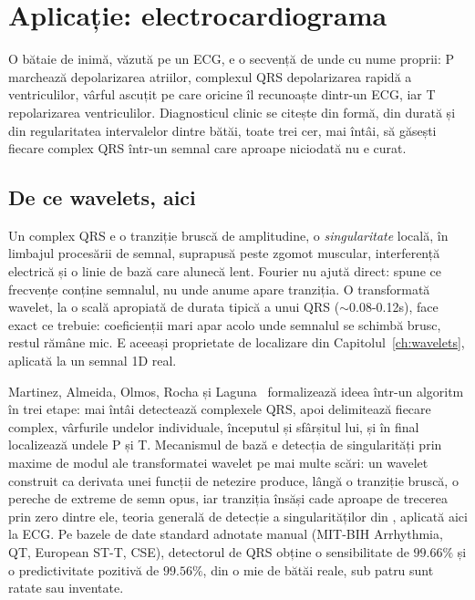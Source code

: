 \chapter{Aplicație: electrocardiograma}
\label{ch:ecg}

O bătaie de inimă, văzută pe un ECG, e o secvență de unde cu nume proprii: P
marchează depolarizarea atriilor, complexul QRS depolarizarea rapidă a
ventriculilor, vârful ascuțit pe care oricine îl recunoaște dintr-un ECG,
iar T repolarizarea ventriculilor. Diagnosticul clinic se citește din formă,
din durată și din regularitatea intervalelor dintre bătăi, toate trei cer,
mai întâi, să găsești fiecare complex QRS într-un semnal care aproape
niciodată nu e curat.

\section{De ce wavelets, aici}

Un complex QRS e o tranziție bruscă de amplitudine, o \emph{singularitate}
locală, în limbajul procesării de semnal, suprapusă peste zgomot muscular,
interferență electrică și o linie de bază care alunecă lent. Fourier nu
ajută direct: spune ce frecvențe conține semnalul, nu unde anume apare
tranziția. O transformată wavelet, la o scală apropiată de durata tipică a
unui QRS ($\sim$0.08-0.12s), face exact ce trebuie: coeficienții mari
apar acolo unde semnalul se schimbă brusc, restul rămâne mic. E aceeași
proprietate de localizare din Capitolul~\ref{ch:wavelets}, aplicată la un
semnal 1D real.

Martinez, Almeida, Olmos, Rocha și Laguna~\cite{martinez2004} formalizează
ideea într-un algoritm în trei etape: mai întâi detectează complexele QRS,
apoi delimitează fiecare complex, vârfurile undelor individuale, începutul
și sfârșitul lui, și în final localizează undele P și T. Mecanismul de
bază e detecția de singularități prin maxime de modul ale transformatei
wavelet pe mai multe scări: un wavelet construit ca derivata unei funcții de
netezire produce, lângă o tranziție bruscă, o pereche de extreme de semn
opus, iar tranziția însăși cade aproape de trecerea prin zero dintre ele,
teoria generală de detecție a singularităților din
\cite{mallat1989,mallat2008}, aplicată aici la ECG. Pe bazele de date
standard adnotate manual (MIT-BIH Arrhythmia, QT, European ST-T, CSE),
detectorul de QRS obține o sensibilitate de $99.66\%$ și o predictivitate
pozitivă de $99.56\%$, din o mie de bătăi reale, sub patru sunt ratate sau
inventate.

